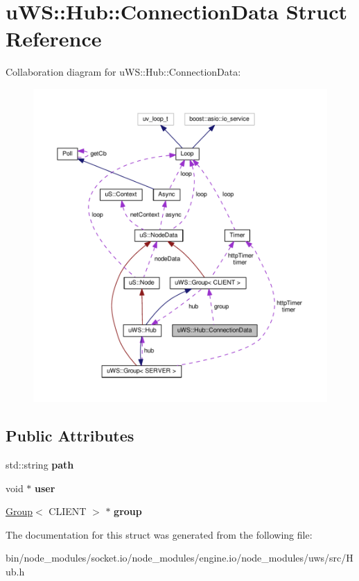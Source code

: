 \hypertarget{structu_w_s_1_1_hub_1_1_connection_data}{}\section{u\+WS\+:\+:Hub\+:\+:Connection\+Data Struct Reference}
\label{structu_w_s_1_1_hub_1_1_connection_data}


Collaboration diagram for u\+WS\+:\+:Hub\+:\+:Connection\+Data\+:
\nopagebreak
\begin{figure}[H]
\begin{center}
\leavevmode
\includegraphics[width=350pt]{structu_w_s_1_1_hub_1_1_connection_data__coll__graph}
\end{center}
\end{figure}
\subsection*{Public Attributes}
\begin{DoxyCompactItemize}
\item 
\mbox{\label{structu_w_s_1_1_hub_1_1_connection_data_a67ec8edccbc3f8e837813ed9663272cc}} 
std\+::string {\bfseries path}
\item 
\mbox{\label{structu_w_s_1_1_hub_1_1_connection_data_afd112ebb97d9a642efc7351db255dfde}} 
void $\ast$ {\bfseries user}
\item 
\mbox{\label{structu_w_s_1_1_hub_1_1_connection_data_a1e7586bc5033b39503097199be6a0617}} 
\mbox{\hyperlink{structu_w_s_1_1_group}{Group}}$<$ C\+L\+I\+E\+NT $>$ $\ast$ {\bfseries group}
\end{DoxyCompactItemize}


The documentation for this struct was generated from the following file\+:\begin{DoxyCompactItemize}
\item 
bin/node\+\_\+modules/socket.\+io/node\+\_\+modules/engine.\+io/node\+\_\+modules/uws/src/Hub.\+h\end{DoxyCompactItemize}

